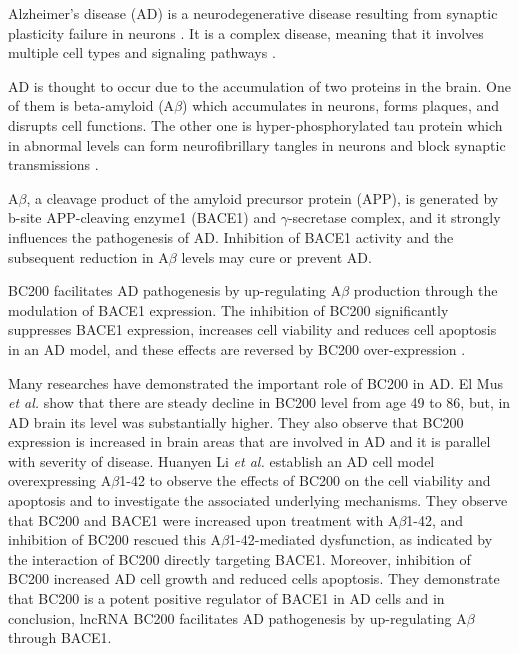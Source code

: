 \documentclass[conference]{IEEEtran}
\begin{document}
Alzheimer's disease (AD) is a neurodegenerative disease resulting from synaptic plasticity failure in neurons \cite{mus2007dendritic}. 
It is a complex disease, meaning that it involves multiple cell types and signaling pathways \cite{zhang2021role}.

AD is thought to occur due to the accumulation of two proteins in the brain. 
One of them is beta-amyloid (A$\beta$) which accumulates in neurons, forms plaques, and disrupts cell functions. 
The other one is hyper-phosphorylated tau protein which in abnormal levels can form neurofibrillary tangles in neurons and block synaptic transmissions \cite{zhang2021role}.

A$\beta$, a cleavage product of the amyloid precursor protein (APP), is generated by b-site APP-cleaving enzyme1 (BACE1) and $\gamma$-secretase complex, and it strongly influences the pathogenesis of AD. 
Inhibition of BACE1 activity and the subsequent reduction in A$\beta$ levels may cure or prevent AD\cite{li2018identification,zhang2021role}.

BC200 facilitates AD pathogenesis by up-regulating A$\beta$ production through the modulation of BACE1 expression. 
The inhibition of BC200 significantly suppresses BACE1 expression, increases cell viability and reduces cell apoptosis in an AD model, and these effects are reversed by BC200 over-expression \cite{li2018identification,zhang2021role}.

Many researches have demonstrated the important role of BC200 in AD. 
El Mus \emph{et al.} \cite{mus2007dendritic} show that there are steady decline in BC200 level from age 49 to 86, but, in AD brain its level was substantially higher. 
They also observe that BC200 expression is increased in brain areas that are involved in AD and it is parallel with severity of disease. 
Huanyen Li \emph{et al.} \cite{li2018identification} establish an AD cell model overexpressing A$\beta$1-42 to observe the effects of BC200 on the cell viability and apoptosis and to investigate the associated underlying mechanisms. 
They observe that BC200 and BACE1 were increased upon treatment with A$\beta$1-42, and inhibition of BC200 rescued this A$\beta$1-42-mediated dysfunction, as indicated by the interaction of BC200 directly targeting BACE1. 
Moreover, inhibition of BC200 increased AD cell growth and reduced cells apoptosis. 
They demonstrate that BC200 is a potent positive regulator of BACE1 in AD cells and in conclusion, lncRNA BC200 facilitates AD pathogenesis by up-regulating A$\beta$ through BACE1.  					 			 		 	 
\end{document}
